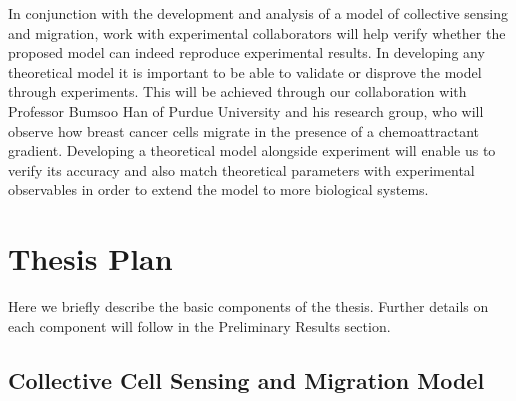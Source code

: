 \documentclass[phys,prelim]{puthesis}
\begin{document}
In conjunction with the development and analysis of a model of collective sensing and migration, work with experimental collaborators will help verify whether the proposed model can indeed reproduce experimental results. In developing any theoretical model it is important to be able to validate or disprove the model through experiments. This will be achieved through our collaboration with Professor Bumsoo Han of Purdue University and his research group, who will observe how breast cancer cells migrate in the presence of a chemoattractant gradient. Developing a theoretical model alongside experiment will enable us to verify its accuracy and also match theoretical parameters with experimental observables in order to extend the model to more biological systems.


\chapter{Thesis Plan}

Here we briefly describe the basic components of the thesis. Further details on each component will follow in the Preliminary Results section.

\section{Collective Cell Sensing and Migration Model}
\end{document}
